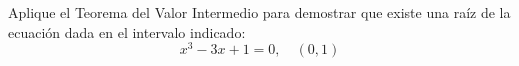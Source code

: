 \setcounter{enumi}{50}
\item Aplique el Teorema del Valor Intermedio para demostrar que existe una raíz de la ecuación dada en el intervalo indicado:
$$x^3 - 3x + 1 = 0, \quad (0, 1)$$
